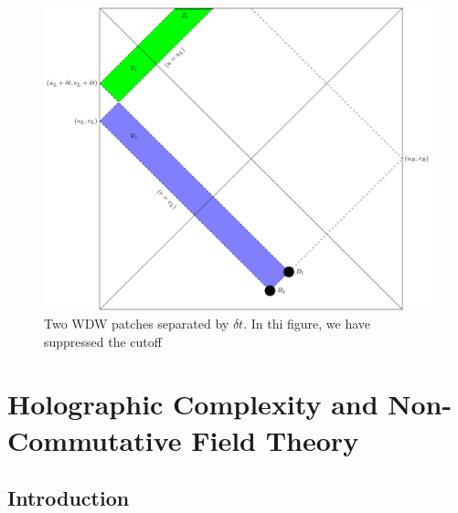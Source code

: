 \documentclass[8pt,aspectratio=169]{beamer}
\begin{document}
\begin{frame}
\begin{minipage}[t]{0.48\linewidth}
\begin{figure}
\begin{center}
        \includegraphics[scale=0.35]{2WDW.pdf}    
    
    \end{center}
    \caption{Two WDW patches separated by $\delta t$.  In thi figure, we have suppressed the cutoff}
    \label{fig:2WDW}
\end{figure}

\end{minipage}

\end{frame}

\section{Holographic Complexity and Non-Commutative Field Theory}

\subsection{Introduction}
\end{document}
